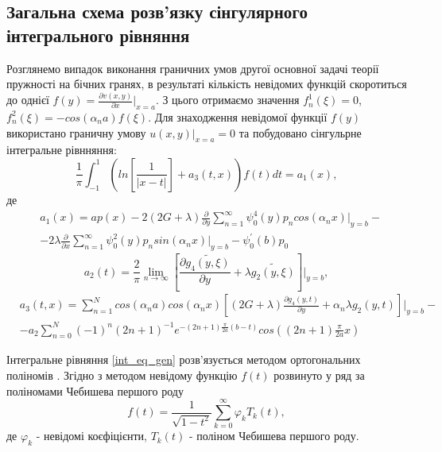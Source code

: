 \subsection{Загальна схема розв'язку сінгулярного інтегрального рівняння}
Розглянемо випадок виконання граничних умов другої основної задачі теорії пружності на бічних гранях, в результаті кількість невідомих функцій скоротиться до однієї $f(y) = \frac{\partial v(x,y)}{\partial x}|_{x=a}$.
З цього отримаємо значення $f_n^1(\xi) = 0$, $f_n^2(\xi)= -cos(\alpha_n a) f(\xi)$.
Для знаходження невідомої функції $f(y)$ використано граничну умову $u(x, y) |_{x=a} = 0$ та побудовано сінгульрне інтегральне рівнняння:
\begin{equation}\label{int_eq_gen}
    \frac{1}{\pi} \int_{-1}^{1} \left( ln\left[ \frac{1}{\lvert x - t \rvert} \right] + a_3(t, x) \right) f(t) dt = a_1(x),
\end{equation}
де
\begin{align*}
    &a_1(x) = a p(x) - 2(2G + \lambda) \frac{\partial}{\partial y} \sum_{n=1}^{\infty} \psi_0^{4}(y) p_n cos(\alpha_n x)|_{y=b} - \nonumber \\
    &- 2\lambda \frac{\partial}{\partial x} \sum_{n=1}^{\infty}\psi_0^2(y) p_n sin(\alpha_n x)|_{y=b} - \psi_0^{'}(b) p_0
\end{align*}
\begin{equation*}
    a_2(t) = \frac{2}{\pi} \lim_{n \rightarrow \infty}\left[ \frac{\partial \widetilde{g_4(y, \xi)}}{\partial y} + \lambda \widetilde{g_2(y, \xi)} \right]|_{y=b}, 
\end{equation*}
\begin{align*}
    &a_3(t, x) = \sum_{n=1}^{N} cos(\alpha_n a) cos(\alpha_n x) \left[(2G + \lambda) \frac{\partial g_4(y, t)}{\partial y} + \alpha_n \lambda g_2(y, t) \right]|_{y=b} - \\
    & - a_2 \sum_{n=0}^{N} (-1)^n (2n + 1)^{-1} e^{-(2n + 1) \frac{\pi}{2a} (b - t)} cos((2n + 1) \frac{\pi}{2a} x)
\end{align*}

Інтегральне рівняння \eqref{int_eq_gen} розв'язується методом ортогональних поліномів \cite{popov_3}.
Згідно з методом невідому функцію $f(t)$ розвинуто у ряд за поліномами Чебишева першого роду
\begin{equation}\label{unk_fun_gen}
    f(t) = \frac{1}{\sqrt{1 - t^2}} \sum_{k=0}^{\infty} \varphi_k T_{k}(t),
\end{equation}
де $\varphi_k$ - невідомі коєфіцієнти, $T_{k}(t)$ - поліном Чебишева першого роду.

